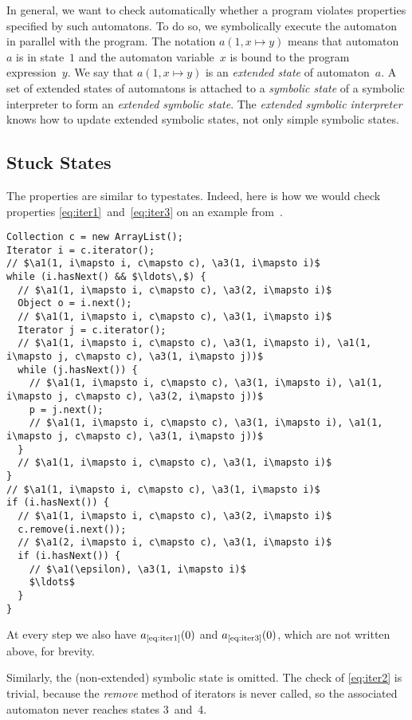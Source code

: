\documentclass[a4paper]{article}
\theoremstyle{slanted}
\theoremstyle{definition}
\theoremstyle{remark}
\begin{document}
In general, we want to check automatically whether a program violates properties specified by such automatons.
To do so, we symbolically execute the automaton in parallel with the program.
The notation $a(1, x\mapsto y)$ means that automaton~$a$ is in state~$1$ and the automaton variable~$x$ is bound to the program expression~$y$.
We say that $a(1,x\mapsto y)$ is an \emph{extended state} of automaton~$a$.
A set of extended states of automatons is attached to a \emph{symbolic state} of a symbolic interpreter to form an \emph{extended symbolic state}.
The \emph{extended symbolic interpreter} knows how to update extended symbolic states, not only simple symbolic states.


\subsection{Stuck States}\label{sec:stuck} %

The properties are similar to typestates.
Indeed, here is how we would check properties \eqref{eq:iter1}~and~\eqref{eq:iter3} on an example from~\cite{bierhoff2007}.
{\def\a#1{a_\text{\ref{eq:iter#1}} }
\begin{lstlisting}
Collection c = new ArrayList();
Iterator i = c.iterator();
// $\a1(1, i\mapsto i, c\mapsto c), \a3(1, i\mapsto i)$
while (i.hasNext() && $\ldots\,$) {
  // $\a1(1, i\mapsto i, c\mapsto c), \a3(2, i\mapsto i)$
  Object o = i.next();
  // $\a1(1, i\mapsto i, c\mapsto c), \a3(1, i\mapsto i)$
  Iterator j = c.iterator();
  // $\a1(1, i\mapsto i, c\mapsto c), \a3(1, i\mapsto i), \a1(1, i\mapsto j, c\mapsto c), \a3(1, i\mapsto j))$
  while (j.hasNext()) {
    // $\a1(1, i\mapsto i, c\mapsto c), \a3(1, i\mapsto i), \a1(1, i\mapsto j, c\mapsto c), \a3(2, i\mapsto j))$
    p = j.next();
    // $\a1(1, i\mapsto i, c\mapsto c), \a3(1, i\mapsto i), \a1(1, i\mapsto j, c\mapsto c), \a3(1, i\mapsto j))$
  }
  // $\a1(1, i\mapsto i, c\mapsto c), \a3(1, i\mapsto i)$
}
// $\a1(1, i\mapsto i, c\mapsto c), \a3(1, i\mapsto i)$
if (i.hasNext()) {
  // $\a1(1, i\mapsto i, c\mapsto c), \a3(2, i\mapsto i)$
  c.remove(i.next());
  // $\a1(2, i\mapsto i, c\mapsto c), \a3(1, i\mapsto i)$
  if (i.hasNext()) {
    // $\a1(\epsilon), \a3(1, i\mapsto i)$
    $\ldots$
  }
}
\end{lstlisting}
At every step we also have $\a1(0)$ and $\a3(0)$, which are not written above, for brevity.}
Similarly, the (non-extended) symbolic state is omitted.
The check of \eqref{eq:iter2} is trivial, because the \textit{remove} method of iterators is never called, so the associated automaton never reaches states 3~and~4.
\end{document}
